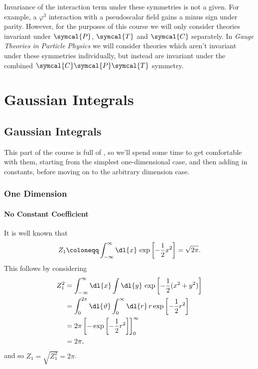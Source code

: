 \documentclass[fleqn]{NotesClass}
\newcommand*{\course}[1]{\textit{#1}}
\newcommand{\parity}{\symcal{P}}
\newcommand{\chargeConjugation}{\symcal{C}}
\newcommand{\timeReversal}{\symcal{T}}
\begin{document}
    Invariance of the interaction term under these symmetries is not a given.
    For example, a \(\varphi^3\) interaction with a pseudoscalar field gains a minus sign under parity.
    However, for the purposes of this course we will only consider theories invariant under \(\parity\), \(\timeReversal\) and \(\chargeConjugation\) separately.
    In \course{Gauge Theories in Particle Physics} we will consider theories which aren't invariant under these symmetries individually, but instead are invariant under the combined \(\chargeConjugation \parity \timeReversal\)
    symmetry.
    
    
    
    
    
    
    
    
    \part{Gaussian Integrals}
    \chapter{Gaussian Integrals}
    This part of the course is full of , so we'll spend some time to get comfortable with them, starting from the simplest one-dimensional case, and then adding in constants, before moving on to the arbitrary dimension case.
    \section{One Dimension}
    \subsection{No Constant Coefficient}
    It is well known that
    \begin{equation}
        Z_{1} \coloneqq \int_{-\infty}^{\infty} \dl{x} \, \exp\left[ -\frac{1}{2}x^2 \right] = \sqrt{2\pi}.
    \end{equation}
    This follows by considering
    \begin{align}
        Z_{1}^2 &= \int_{-\infty}^{\infty} \dl{x} \int \dl{y} \, \exp\left[ -\frac{1}{2}(x^2 + y^2) \right]\\
        &= \int_{0}^{2\pi} \dl{\vartheta} \int_{0}^{\infty} \dl{r} \, r \exp\left[ -\frac{1}{2}r^2 \right]\\
        &= 2\pi \left[ -\exp\left[ -\frac{1}{2}r^2 \right] \right]_{0}^{\infty}\\
        &= 2\pi,
    \end{align}
    and so \(Z_1 = \sqrt{Z_1^2} = 2\pi\).
    
\end{document}

